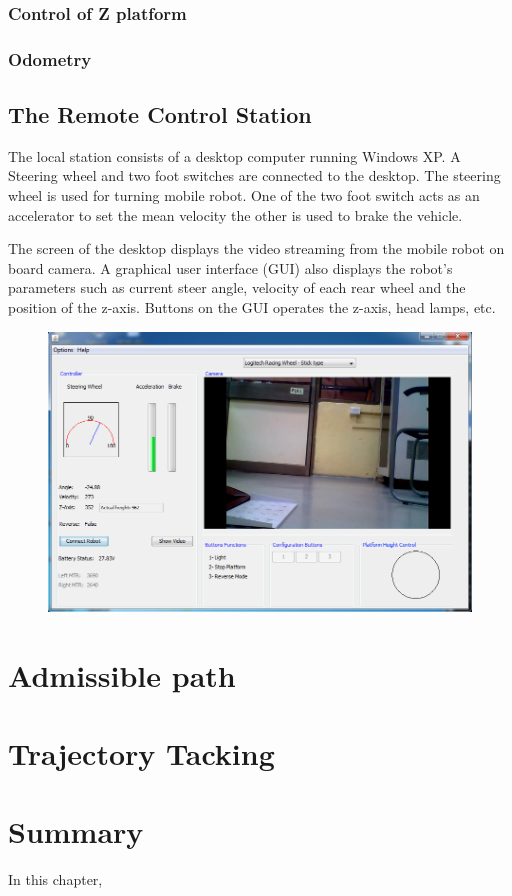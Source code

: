\subsubsection{Control of Z platform}
\subsubsection{Odometry }



\subsection{The Remote Control Station}   
The local station consists of a desktop computer running Windows XP. A Steering wheel and two foot switches are connected to the desktop. The steering wheel is used for turning  mobile robot. One of the two foot switch acts as an accelerator to set the mean velocity the other  is used to brake the vehicle.

The screen of the desktop displays the video streaming  from the mobile robot on board camera. A graphical user  interface (GUI) also displays the robot's parameters such as current steer angle, velocity of each rear wheel and the position of the z-axis. Buttons on the GUI operates the z-axis, head lamps, etc.

\begin{figure}
	\includegraphics[width=\linewidth,keepaspectratio]{Chapter5/fig/gui}
	\label{fig:Gui} 
\end{figure}

\section{Admissible path}
\section{Trajectory Tacking}


\section{Summary}
In this chapter, 
